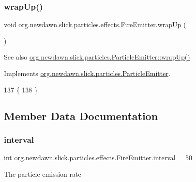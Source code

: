 \subsubsection{\texorpdfstring{wrap\+Up()}{wrapUp()}}
{\footnotesize\ttfamily void org.\+newdawn.\+slick.\+particles.\+effects.\+Fire\+Emitter.\+wrap\+Up (\begin{DoxyParamCaption}{ }\end{DoxyParamCaption})\hspace{0.3cm}{\ttfamily [inline]}}

\begin{DoxySeeAlso}{See also}
\mbox{\hyperlink{interfaceorg_1_1newdawn_1_1slick_1_1particles_1_1_particle_emitter_ad8549755b39d63bdde71860be6b0f1f9}{org.\+newdawn.\+slick.\+particles.\+Particle\+Emitter\+::wrap\+Up()}} 
\end{DoxySeeAlso}


Implements \mbox{\hyperlink{interfaceorg_1_1newdawn_1_1slick_1_1particles_1_1_particle_emitter_ad8549755b39d63bdde71860be6b0f1f9}{org.\+newdawn.\+slick.\+particles.\+Particle\+Emitter}}.


\begin{DoxyCode}
137                          \{
138     \}
\end{DoxyCode}


\subsection{Member Data Documentation}
\mbox{\label{classorg_1_1newdawn_1_1slick_1_1particles_1_1effects_1_1_fire_emitter_a007bd6dc16865e8d71b373bbd29acd1f}} 
\subsubsection{\texorpdfstring{interval}{interval}}
{\footnotesize\ttfamily int org.\+newdawn.\+slick.\+particles.\+effects.\+Fire\+Emitter.\+interval = 50\hspace{0.3cm}{\ttfamily [private]}}

The particle emission rate \mbox{\label{classorg_1_1newdawn_1_1slick_1_1particles_1_1effects_1_1_fire_emitter_a56f377cd2920bfb430498077465db884}} 
